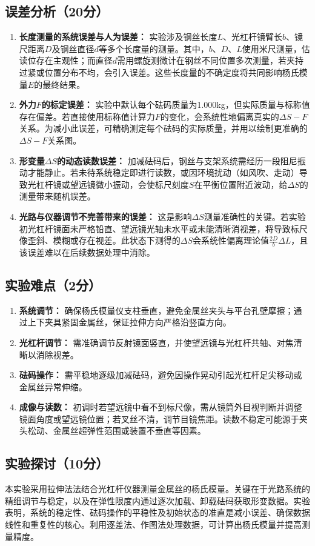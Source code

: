 \documentclass[]{../../templates/Report}%
\begin{document}
\begin{fullreportonly}
\subsection{误差分析（20分）}
\begin{enumerate}
\item \textbf{长度测量的系统误差与人为误差：} 实验涉及钢丝长度$L$、光杠杆镜臂长$b$、镜尺距离$D$及钢丝直径$d$等多个长度量的测量。其中，$b$、$D$、$L$使用米尺测量，估读位存在主观性；而直径$d$需用螺旋测微计在钢丝不同位置多次测量，若夹持过紧或位置分布不均，会引入误差。这些长度量的不确定度将共同影响杨氏模量$E$的最终结果。
\item \textbf{外力$F$的标定误差：} 实验中默认每个砝码质量为1.000kg，但实际质量与标称值存在偏差。若直接使用标称值计算力$F$的变化，会系统性地偏离真实的$\Delta S-F$关系。为减小此误差，可精确测定每个砝码的实际质量，并用以绘制更准确的$\Delta S-F$关系图。
\item \textbf{形变量$\Delta S$的动态读数误差：} 加减砝码后，钢丝与支架系统需经历一段阻尼振动才能静止。若未待系统稳定即进行读数，或因环境扰动（如风吹、走动）导致光杠杆镜或望远镜微小振动，会使标尺刻度$S$在平衡位置附近波动，给$\Delta S$的测量带来随机误差。
\item \textbf{光路与仪器调节不完善带来的误差：} 这是影响$\Delta S$测量准确性的关键。若实验初光杠杆镜面未严格铅直、望远镜光轴未水平或未能清晰消视差，将导致标尺像歪斜、模糊或存在视差。此状态下测得的$\Delta S$会系统性偏离理论值$\frac{2D}{b}\Delta L$，且该误差难以在后续数据处理中消除。
\end{enumerate}
\subsection{实验难点（2分）}
\begin{enumerate}
\item \textbf{系统调节：} 确保杨氏模量仪支柱垂直，避免金属丝夹头与平台孔壁摩擦；通过上下夹具紧固金属丝，保证拉伸方向严格沿竖直方向。
\item \textbf{光杠杆调节：} 需准确调节反射镜面竖直，并使望远镜与光杠杆共轴、对焦清晰以消除视差。
\item \textbf{砝码操作：} 需平稳地逐级加减砝码，避免因操作晃动引起光杠杆足尖移动或金属丝异常伸缩。
\item \textbf{成像与读数：} 初调时若望远镜中看不到标尺像，需从镜筒外目视判断并调整镜面角度或望远镜位置；若叉丝不清，调节目镜焦距。读数不稳定可能源于夹头松动、金属丝超弹性范围或装置不垂直等因素。
\end{enumerate}
\subsection{实验探讨（10分）}
本实验采用拉伸法法结合光杠杆仪器测量金属丝的杨氏模量。关键在于光路系统的精细调节与稳定，以及在弹性限度内通过逐次加载、卸载砝码获取形变数据。实验表明，系统的稳定性、砝码操作的平稳性及初始状态的准直是减小误差、确保数据线性和重复性的核心。利用逐差法、作图法处理数据，可计算出杨氏模量并提高测量精度。

\end{fullreportonly}
\end{document}
